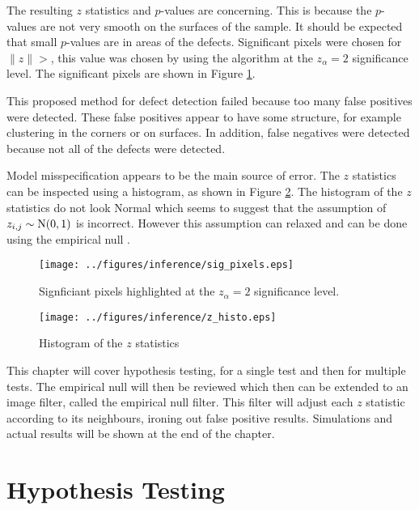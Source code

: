 The resulting $z$ statistics and $p$-values are concerning. This is because the $p$-values are not very smooth on the surfaces of the sample. It should be expected that small $p$-values are in areas of the defects. Significant pixels were chosen for $\|z\|>$, this value was chosen by using the \cite{benjamini1995controlling} algorithm at the $z_\alpha = 2$ significance level. The significant pixels are shown in Figure \ref{fig:sig_pixels}.

This proposed method for defect detection failed because too many false positives were detected. These false positives appear to have some structure, for example clustering in the corners or on surfaces. In addition, false negatives were detected because not all of the defects were detected.

Model misspecification appears to be the main source of error. The $z$ statistics can be inspected using a histogram, as shown in Figure \ref{fig:z_histo}. The histogram of the $z$ statistics do not look Normal which seems to suggest that the assumption of $z_{i,j}\sim \operatorname{N}(0,1)$ is incorrect. However this assumption can relaxed and can be done using the empirical null \citep{efron2004large}.

\begin{figure}
    \centering
    \texttt{[image: ../figures/inference/sig\_pixels.eps]}
    \caption{Signficiant pixels highlighted at the $z_\alpha = 2$ significance level.}
    \label{fig:sig_pixels}
\end{figure}

\begin{figure}
    \centering
    \texttt{[image: ../figures/inference/z\_histo.eps]}
    \caption{Histogram of the $z$ statistics}
    \label{fig:z_histo}
\end{figure}

This chapter will cover hypothesis testing, for a single test and then for multiple tests. The empirical null will then be reviewed which then can be extended to an image filter, called the empirical null filter. This filter will adjust each $z$ statistic according to its neighbours, ironing out false positive results. Simulations and actual results will be shown at the end of the chapter.

\section{Hypothesis Testing}

